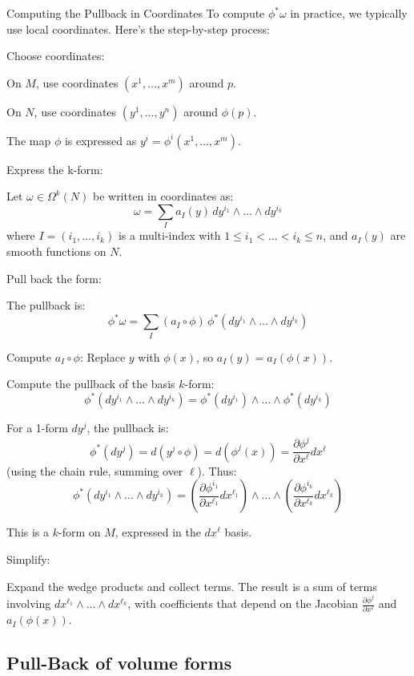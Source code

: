 Computing the Pullback in Coordinates
To compute $ \phi^* \omega $ in practice, we typically use local coordinates. Here’s the step-by-step process:

Choose coordinates:

On $ M $, use coordinates $ (x^1, \dots, x^m) $ around $ p $.

On $ N $, use coordinates $ (y^1, \dots, y^n) $ around $ \phi(p) $.

The map $ \phi $ is expressed as $ y^i = \phi^i(x^1, \dots, x^m) $.

Express the k-form:

Let $ \omega \in \Omega^k(N) $ be written in coordinates as:
$$\omega = \sum_{I} a_I(y) \, dy^{i_1} \wedge \dots \wedge dy^{i_k}$$
where $ I = (i_1, \dots, i_k) $ is a multi-index with $ 1 \leq i_1 < \dots < i_k \leq n $, and $ a_I(y) $ are smooth functions on $ N $.


Pull back the form:

The pullback is:
$$\phi^* \omega = \sum_{I} (a_I \circ \phi) \, \phi^* (dy^{i_1} \wedge \dots \wedge dy^{i_k})$$

Compute $ a_I \circ \phi $: Replace $ y $ with $ \phi(x) $, so $ a_I(y) = a_I(\phi(x)) $.

Compute the pullback of the basis $ k $-form:
$$\phi^* (dy^{i_1} \wedge \dots \wedge dy^{i_k}) = \phi^* (dy^{i_1}) \wedge \dots \wedge \phi^* (dy^{i_k})$$

For a 1-form $ dy^j $, the pullback is:
$$\phi^* (dy^j) = d (y^j \circ \phi) = d (\phi^j(x)) = \frac{\partial \phi^j}{\partial x^\ell} dx^\ell$$
(using the chain rule, summing over $ \ell $).
Thus:
$$\phi^* (dy^{i_1} \wedge \dots \wedge dy^{i_k}) = \left( \frac{\partial \phi^{i_1}}{\partial x^{\ell_1}} dx^{\ell_1} \right) \wedge \dots \wedge \left( \frac{\partial \phi^{i_k}}{\partial x^{\ell_k}} dx^{\ell_k} \right)$$

This is a $ k $-form on $ M $, expressed in the $ dx^\ell $ basis.


Simplify:

Expand the wedge products and collect terms.
The result is a sum of terms involving $ dx^{\ell_1} \wedge \dots \wedge dx^{\ell_k} $, with coefficients that depend on the Jacobian $ \frac{\partial \phi^j}{\partial x^\ell} $ and $ a_I(\phi(x)) $.

\subsection{Pull-Back of volume forms}
